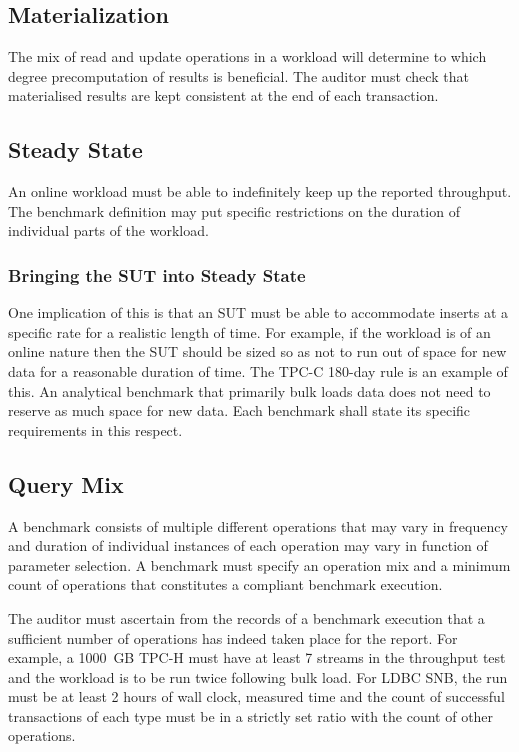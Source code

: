 \subsection{Materialization}

The mix of read and update operations in a workload will determine to which degree precomputation of results is beneficial. The auditor must check that materialised results are kept consistent at the end of each transaction.

\subsection{Steady State}

An online workload must be able to indefinitely keep up the reported throughput. The benchmark definition may put specific restrictions on the duration of individual parts of the workload.

\subsubsection{Bringing the SUT into Steady State} One implication of this is that an SUT must be able to accommodate inserts at a specific rate for a realistic length of time. For example, if the workload is of an online nature then the SUT should be sized so as not to run out of space for new data for a reasonable duration of time. The \mbox{TPC-C} 180-day rule is an example of this. An analytical benchmark that primarily bulk loads data does not need to reserve as much space for new data. Each benchmark shall state its specific requirements in this respect.

\subsection{Query Mix}

A benchmark consists of multiple different operations that may vary in frequency and duration of individual
instances of each operation may vary in function of parameter selection. A benchmark must specify an operation
mix and a minimum count of operations that constitutes a compliant benchmark execution.

The auditor must ascertain from the records of a benchmark execution that a sufficient number of operations has indeed taken place for the report. For example, a 1000~GB \mbox{TPC-H} must have at least 7 streams in the throughput test and the workload is to be run twice following bulk load. For LDBC SNB, the run must be at least 2 hours of wall clock, measured time and the count of successful transactions of each type must be in a strictly set ratio with the count of other operations.

